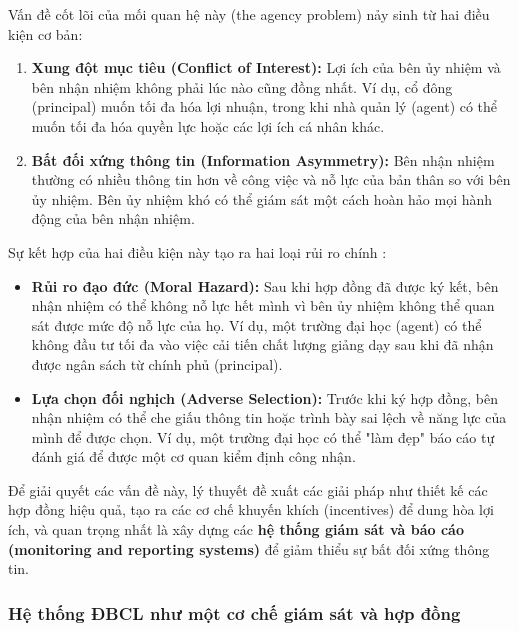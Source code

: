 \documentclass[12pt, a4paper, openany]{report}
\begin{document}
Vấn đề cốt lõi của mối quan hệ này (the agency problem) nảy sinh từ hai điều kiện cơ bản:
\begin{enumerate}
    \item \textbf{Xung đột mục tiêu (Conflict of Interest):} Lợi ích của bên ủy nhiệm và bên nhận nhiệm không phải lúc nào cũng đồng nhất. Ví dụ, cổ đông (principal) muốn tối đa hóa lợi nhuận, trong khi nhà quản lý (agent) có thể muốn tối đa hóa quyền lực hoặc các lợi ích cá nhân khác.
    \item \textbf{Bất đối xứng thông tin (Information Asymmetry):} Bên nhận nhiệm thường có nhiều thông tin hơn về công việc và nỗ lực của bản thân so với bên ủy nhiệm. Bên ủy nhiệm khó có thể giám sát một cách hoàn hảo mọi hành động của bên nhận nhiệm.
\end{enumerate}
Sự kết hợp của hai điều kiện này tạo ra hai loại rủi ro chính \cite{Eisenhardt1989}:
\begin{itemize}
    \item \textbf{Rủi ro đạo đức (Moral Hazard):} Sau khi hợp đồng đã được ký kết, bên nhận nhiệm có thể không nỗ lực hết mình vì bên ủy nhiệm không thể quan sát được mức độ nỗ lực của họ. Ví dụ, một trường đại học (agent) có thể không đầu tư tối đa vào việc cải tiến chất lượng giảng dạy sau khi đã nhận được ngân sách từ chính phủ (principal).
    \item \textbf{Lựa chọn đối nghịch (Adverse Selection):} Trước khi ký hợp đồng, bên nhận nhiệm có thể che giấu thông tin hoặc trình bày sai lệch về năng lực của mình để được chọn. Ví dụ, một trường đại học có thể "làm đẹp" báo cáo tự đánh giá để được một cơ quan kiểm định công nhận.
\end{itemize}
Để giải quyết các vấn đề này, lý thuyết đề xuất các giải pháp như thiết kế các hợp đồng hiệu quả, tạo ra các cơ chế khuyến khích (incentives) để dung hòa lợi ích, và quan trọng nhất là xây dựng các \textbf{hệ thống giám sát và báo cáo (monitoring and reporting systems)} để giảm thiểu sự bất đối xứng thông tin.


\subsubsection{Hệ thống ĐBCL như một cơ chế giám sát và hợp đồng}
\end{document}
